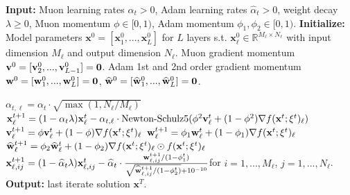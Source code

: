 \documentclass{article}
\theoremstyle{plain}
\theoremstyle{definition}
\theoremstyle{remark}
\def\bx{\mathbf{x}}
\begin{document}
\begin{algorithm}
\caption{Muon}
\label{alg:muon_adam}
\begin{algorithmic}[1]
\STATE \textbf{Input:} Muon learning rates $\alpha_t > 0$, Adam learning rates $\widehat{\alpha}_t > 0$, weight decay $\lambda \ge 0$, Muon momentum $\phi \in [0, 1)$, Adam momentum $\phi_1, \phi_2\in [0, 1)$.
\STATE \textbf{Initialize:} Model parameters $\bx^0 = [\bx_1^0, ..., \bx_L^0]$ for $L$ layers s.t. $\bx^0_{\ell} \in \mathbb{R}^{M_\ell \times N_\ell}$ with input dimension $M_\ell$ and output dimension $N_\ell$. Muon gradient momentum ${\bf v}^0 = [{\bf v}_2^0, ..., {\bf v}_{L-1}^0] = {\bf 0}$. Adam 1st and 2nd order gradient momentum ${\bf w}^0 = [{\bf w}_1^0, ..., {\bf w}_L^0] = {\bf 0}$, $\widehat{{\bf w}}^0 = [\widehat{\bf w}_1^0, ...,\widehat{\bf w}_L^0] = {\bf 0}$.

        \STATE $\alpha_{t, \ell} = \alpha_t \cdot  \sqrt{\max(1, N_\ell/M_\ell)}$ 
        \STATE \label{alg_step:muon_double_ema_1} $\bx^{t+1}_{\ell} = (1 - \alpha_t \lambda) \bx^t_{\ell} - \alpha_{t, \ell} \cdot \text{Newton-Schulz5}(\phi^2 {\bf v}^t_{\ell} + (1-\phi^2) \nabla f(\bx^t; \xi^t)_{\ell} )$
        \STATE  \label{alg_step:muon_double_ema_2} ${\bf v}^{t+1}_{\ell} = \phi {\bf v}^t_{\ell} + (1 - \phi) \nabla f(\bx^t; \xi^t)_{\ell}$
    \ELSE 
        \STATE ${\bf w}^{t+1}_{\ell} = \phi_1 {\bf w}^{t}_{\ell} + (1 - \phi_1) \nabla f(\bx^t; \xi^t)_\ell$
        \STATE $\widehat{\bf w}^{t+1}_{\ell} = \phi_2 \widehat{\bf w}^{t}_{\ell} + (1 - \phi_2) \nabla f(\bx^t; \xi^t)_\ell \odot f(\bx^t; \xi^t)_\ell$
        \STATE $\bx^{t+1}_{\ell, ij} = (1 - \widehat{\alpha}_{t} \lambda)\bx^t_{\ell, ij} - \widehat{\alpha}_{t} \cdot \frac{{\bf w}^{t+1}_{\ell, ij} / (1 - \phi_1^t)}{\sqrt{\widehat{\bf w}^{t+1}_{\ell, ij} / (1 - \phi_2^t)} + 10^{-10} }$\quad for \quad $i=1,..., M_\ell$, $j=1,..., N_\ell$. 
    \ENDIF
\ENDFOR
\ENDFOR
\STATE \textbf{Output:} last iterate solution $\bx^{T}$.
\end{algorithmic}
\end{algorithm}
\end{document}
